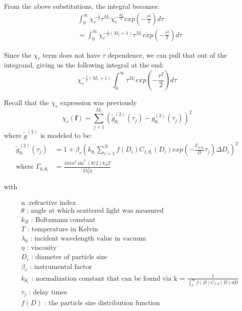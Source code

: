 \documentclass[11pt]{article}
\begin{document}
 From the above substitutions, the integral becomes:
\begin{equation}
\begin{split}
 & \int_{0}^{\infty}\chi_r^{-\frac{1}{2}} \tau^{M_r} \chi_r^{-\frac{M_r}{2}} exp\left( -\frac{\tau^2}{2} \right) d\tau \\
& = \int_{0}^{\infty} \chi_r^{-\frac{1}{2}(M_r + 1)} \tau^{M_r} exp\left( -\frac{\tau^2}{2} \right) d\tau
\end{split}
\end{equation}

Since the $\chi_r$ term does not have $\tau$ dependence, we can pull that out of the integrand, giving us the following integral at the end:
\begin{equation}
\chi_r^{-\frac{1}{2}(M_r + 1) }\int_{0}^{\infty}\tau^{M_r}exp\left( -\frac{\tau^2}{2} \right) d\tau
\end{equation}

Recall that the $\chi_r$ expression was previously 
\begin{equation}
\chi_r(\mathbf{f}) = \sum_{j=1}^{M_r} {\left( \tilde{g}^{(2)}_{\theta_r} (\tau_j) - g^{(2)}_{\theta_r}(\tau_j) \right)}^2
\end{equation}
where $\tilde{g}^{(2)}$ is modeled to be:
\begin{equation} \label{eq:g2}
\begin{split}
 \tilde{g}^{(2)}_{\theta_r} (\tau_j) & = 1 + \beta_r {\left( k_{\theta_r}\sum_{i=1}^{N}f(D_i) C_{I,\theta_r}(D_i) exp\left( -\frac{\Gamma_{0,\theta_r}}{D} \tau_j \right) \Delta D_i \right)}^2 \\
\text{where } \Gamma_{0,\theta_r} & = \frac{16\pi n^2 \sin^2(\theta/2)k_B T}{2\lambda_0^2\eta}
 \end{split}
\end{equation}

with 

\begin{equation}
\begin{split}
& \text{n } : \text{refractive index}\\
& \theta\text{ : angle at which scattered light was measured}\\
& k_B\text{ : Boltzmann constant} \\
& T\text{ : temperature in Kelvin} \\
& \lambda_0\text{ : incident wavelength value in vacuum}\\
& \eta\text{ : viscosity} \\
& D_i\text{ : diameter of particle size}\\
& \beta_r\text{ : instrumental factor}\\
& k_{\theta_r}\text{ : normalization constant that can be found via k = }\frac{1}{\int_{0}^{\infty} f(D)C_{I,\theta}(D) dD}\\
&\tau_j\text{ : delay times} \\
&f(D)\text{ : the particle size distribution function}
\end{split}
\end{equation}
\end{document}
